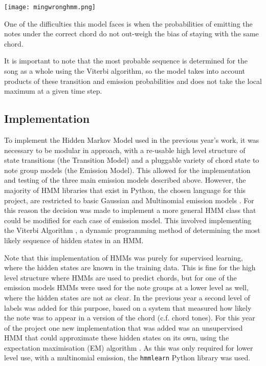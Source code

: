 \documentclass[bsc,singlespacing,logo, parskip, deptreport]{infthesis}
\begin{document}
\begin{center}
  \texttt{[image: mingwronghmm.png]}
\end{center}

One of the difficulties this model faces is when the probabilities of emitting the notes under the correct chord do not out-weigh the bias of staying with the same chord.

It is important to note that the most probable sequence is determined for the song as a whole using the Viterbi algorithm, so the model takes into account products of these transition and emission probabilities and does not take the local maximum at a given time step.

\subsection{Implementation} \label{HMM IMP}

To implement the Hidden Markov Model used in the previous year's work, it was necessary to be modular in approach, with a re-usable high level structure of state transitions (the Transition Model) and a pluggable variety of chord state to note group models (the Emission Model). This allowed for the implementation and testing of the three main emission models described above. However, the majority of HMM libraries that exist in Python, the chosen language for this project, are restricted to basic Gaussian and Multinomial emission models \cite{lebedev_2015} \cite{buitinck}. For this reason the decision was made to implement a more general HMM class that could be modified for each case of emission model. This involved implementing the Viterbi Algorithm \cite{forney1973viterbi}, a dynamic programming method of determining the most likely sequence of hidden states in an HMM.

Note that this implementation of HMMs was purely for supervised learning, where the hidden states are known in the training data. This is fine for the high level structure where HMMs are used to predict chords, but for one of the emission models HMMs were used for the note groups at a lower level as well, where the hidden states are not as clear. In the previous year a second level of labels was added for this purpose, based on a system that measured how likely the note was to appear in a version of the chord (c.f. chord tones). For this year of the project one new implementation that was added was an unsupervised HMM that could approximate these hidden states on its own, using the expectation maximisation (EM) algorithm \cite{moon1996expectation}. As this was only required for lower level use, with a multinomial emission, the {\tt hmmlearn} \cite{lebedev_2015} Python library was used.
\end{document}
